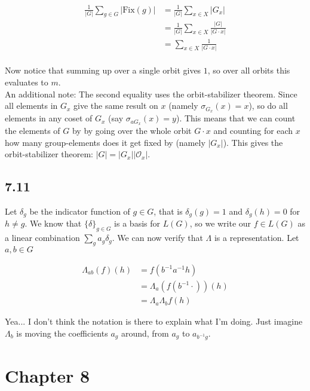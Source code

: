 \documentclass[12pt]{article}
\begin{document}
\begin{equation*}
\begin{split}
    \frac{1}{|G|} \sum_{g \in G} |\mathrm{Fix}(g)|
    &= \frac{1}{|G|} \sum_{x \in X} |G_x| \\
    &= \frac{1}{|G|} \sum_{x \in X} \frac{|G|}{|G \cdot x|} \\
    &= \sum_{x \in X} \frac{1}{|G \cdot x|}
\end{split}
\end{equation*}
\\
Now notice that summing up over a single orbit gives $1$, so over all orbits this evaluates to $m$.
\\
An additional note: The second equality uses the orbit-stabilizer theorem. Since all elements in $G_x$ give the same result on $x$ (namely $\sigma_{G_x}(x) = x$), so do all elements in any coset of $G_x$ (say $\sigma_{aG_x}(x) = y$). This means that we can count the elements of $G$ by by going over the whole orbit $G \cdot x$ and counting for each $x$ how many group-elements does it get fixed by (namely $|G_x|$). This gives the orbit-stabilizer theorem: $|G| = |G_x||\mathcal O_x|$.

\subsection*{7.11}

Let $\delta_g$ be the indicator function of $g \in G$, that is $\delta_g(g) = 1$ and $\delta_g(h) = 0$ for $h \neq g$. We know that $\{\delta\}_{g \in G}$ is a basis for $L(G)$, so we write our $f \in L(G)$ as a linear combination $\sum_g a_g \delta_g$. We can now verify that $\Lambda$ is a representation. Let $a, b \in G$

\begin{align*}
    \Lambda_{ab}(f)(h) &= f(b^{-1} a^{-1} h) \\
    &= \Lambda_{a}(f(b^{-1} \cdot ))(h) \\
    &= \Lambda_{a} \Lambda_{b} f(h)
\end{align*}

\noindent
Yea... I don't think the notation is there to explain what I'm doing. Just imagine $\Lambda_b$ is moving the coefficients $a_g$ around, from $a_g$ to $a_{b^{-1}g}$.



\pagebreak

\section*{Chapter 8}
\end{document}
